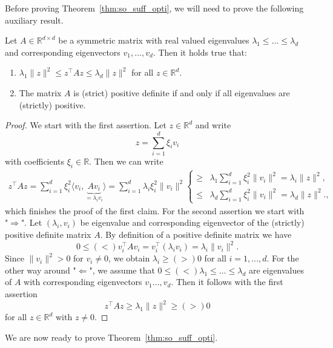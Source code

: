 \documentclass[12pt,openany]{book}
\theoremstyle{definition}
\theoremstyle{definition}
\newcommand{\R}{\mathbb{R}}
\begin{document}
Before proving Theorem~\ref{thm:so_suff_opti}, we will need to prove the following auxiliary result.

\begin{lemma}\label{lem:eigenvalues_definiteness}
Let $A\in\R^{d\times d}$ be a symmetric matrix with real valued eigenvalues $\lambda_1\le \dots\le \lambda_d$ and corresponding eigenvectors $v_1,\dots,v_d$. Then it holds true that:
\begin{enumerate}
\item $\lambda_1\|z\|^2\le z^\top A z\le \lambda_d \|z\|^2$ for all $z\in\R^d$.
\item The matrix $A$ is (strict) positive definite if and only if all eigenvalues are (strictly) positive.
\end{enumerate}
\end{lemma}
\begin{proof}
We start with the first assertion. Let $z\in\R^d$ and write
\[z = \sum_{i=1}^d \xi_i v_i\]
with coefficients $\xi_i\in\R$. Then we can write
\begin{align*}
z^\top A z = \sum_{i=1}^d \xi_i^2 \langle v_i, \underbrace{A v_i}_{=\lambda_i v_i}\rangle = \sum_{i=1}^d \lambda_i \xi_i^2 \|v_i\|^2\begin{cases}\ge & \lambda_1\sum_{i=1}^d \xi_i^2 \|v_i\|^2 = \lambda_i \|z\|^2,\\ \le & \lambda_d \sum_{i=1}^d \xi_i^2\|v_i\|^2 = \lambda_d \|z\|^2., \end{cases}
\end{align*}
which finishes the proof of the first claim. 
For the second assertion we start with "$\Rightarrow$". Let $(\lambda_i,v_i)$ be eigenvalue and corresponding eigenvector of the (strictly) positive definite matrix $A$.  By definition of a  positive definite matrix we have
\[0\le (<) v_i^\top A v_i = v_i^\top (\lambda_i v_i) = \lambda_i \|v_i\|^2. \]
Since $\|v_i\|^2>0$ for $v_i \neq 0$, we obtain $\lambda_i \ge (>) 0$ for all $i=1,\dots,d$.
For the other way around "$\Leftarrow$", we assume that $0\le (<) \lambda_1\le \dots \le \lambda_d$ are eigenvalues of $A$ with corresponding eigenvectors $v_1\dots, v_d$.  Then it follows with the first assertion 
\[z^\top A z \ge \lambda_1 \|z\|^2 \ge (>) 0\]
for all $z\in\R^d$ with $z\neq 0$.
\end{proof}
We are now ready to prove Theorem~\ref{thm:so_suff_opti}.
\end{document}
